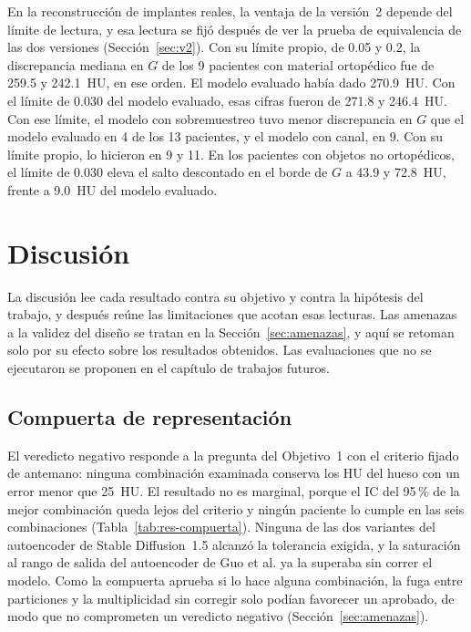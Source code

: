 En la reconstrucción de implantes reales, la ventaja de la versión~2 depende del límite de lectura, y esa lectura se fijó después de ver la prueba de equivalencia de las dos versiones (Sección~\ref{sec:v2}). Con su límite propio, de 0.05 y 0.2, la discrepancia mediana en $G$ de los 9 pacientes con material ortopédico fue de 259.5 y 242.1~HU, en ese orden. El modelo evaluado había dado 270.9~HU. Con el límite de 0.030 del modelo evaluado, esas cifras fueron de 271.8 y 246.4~HU. Con ese límite, el modelo con sobremuestreo tuvo menor discrepancia en $G$ que el modelo evaluado en 4 de los 13 pacientes, y el modelo con canal, en 9. Con su límite propio, lo hicieron en 9 y 11. En los pacientes con objetos no ortopédicos, el límite de 0.030 eleva el salto descontado en el borde de $G$ a 43.9 y 72.8~HU, frente a 9.0~HU del modelo evaluado.

\section{Discusión}\label{sec:discusion}

La discusión lee cada resultado contra su objetivo y contra la hipótesis del trabajo, y después reúne las limitaciones que acotan esas lecturas. Las amenazas a la validez del diseño se tratan en la Sección~\ref{sec:amenazas}, y aquí se retoman solo por su efecto sobre los resultados obtenidos. Las evaluaciones que no se ejecutaron se proponen en el capítulo de trabajos futuros.

\subsection{Compuerta de representación}

El veredicto negativo responde a la pregunta del Objetivo~1 con el criterio fijado de antemano: ninguna combinación examinada conserva los HU del hueso con un error menor que 25~HU. El resultado no es marginal, porque el IC del 95\,\% de la mejor combinación queda lejos del criterio y ningún paciente lo cumple en las seis combinaciones (Tabla~\ref{tab:res-compuerta}). Ninguna de las dos variantes del autoencoder de Stable Diffusion~1.5 alcanzó la tolerancia exigida, y la saturación al rango de salida del autoencoder de Guo et al. ya la superaba sin correr el modelo. Como la compuerta aprueba si lo hace alguna combinación, la fuga entre particiones y la multiplicidad sin corregir solo podían favorecer un aprobado, de modo que no comprometen un veredicto negativo (Sección~\ref{sec:amenazas}).

